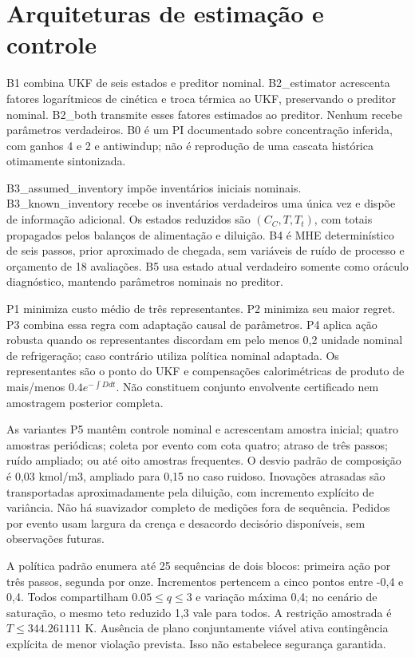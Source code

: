 \documentclass[
  11pt,
]{article}
\begin{document}
\hypertarget{arquiteturas-de-estimauxe7uxe3o-e-controle}{%
\section{Arquiteturas de estimação e
controle}\label{arquiteturas-de-estimauxe7uxe3o-e-controle}}

B1 combina UKF de seis estados e preditor nominal. B2\_estimator
acrescenta fatores logarítmicos de cinética e troca térmica ao UKF,
preservando o preditor nominal. B2\_both transmite esses fatores
estimados ao preditor. Nenhum recebe parâmetros verdadeiros. B0 é um PI
documentado sobre concentração inferida, com ganhos 4 e 2 e antiwindup;
não é reprodução de uma cascata histórica otimamente sintonizada.

B3\_assumed\_inventory impõe inventários iniciais nominais.
B3\_known\_inventory recebe os inventários verdadeiros uma única vez e
dispõe de informação adicional. Os estados reduzidos são
\((C_C,T,T_t)\), com totais propagados pelos balanços de alimentação e
diluição. B4 é MHE determinístico de seis passos, prior aproximado de
chegada, sem variáveis de ruído de processo e orçamento de 18
avaliações. B5 usa estado atual verdadeiro somente como oráculo
diagnóstico, mantendo parâmetros nominais no preditor.

P1 minimiza custo médio de três representantes. P2 minimiza seu maior
regret. P3 combina essa regra com adaptação causal de parâmetros. P4
aplica ação robusta quando os representantes discordam em pelo menos 0,2
unidade nominal de refrigeração; caso contrário utiliza política nominal
adaptada. Os representantes são o ponto do UKF e compensações
calorimétricas de produto de mais/menos \(0.4e^{-\int Ddt}\). Não
constituem conjunto envolvente certificado nem amostragem posterior
completa.

As variantes P5 mantêm controle nominal e acrescentam amostra inicial;
quatro amostras periódicas; coleta por evento com cota quatro; atraso de
três passos; ruído ampliado; ou até oito amostras frequentes. O desvio
padrão de composição é 0,03 kmol/m3, ampliado para 0,15 no caso ruidoso.
Inovações atrasadas são transportadas aproximadamente pela diluição, com
incremento explícito de variância. Não há suavizador completo de
medições fora de sequência. Pedidos por evento usam largura da crença e
desacordo decisório disponíveis, sem observações futuras.

A política padrão enumera até 25 sequências de dois blocos: primeira
ação por três passos, segunda por onze. Incrementos pertencem a cinco
pontos entre -0,4 e 0,4. Todos compartilham \(0.05\le q\le3\) e variação
máxima 0,4; no cenário de saturação, o mesmo teto reduzido 1,3 vale para
todos. A restrição amostrada é \(T\le344.261111\) K. Ausência de plano
conjuntamente viável ativa contingência explícita de menor violação
prevista. Isso não estabelece segurança garantida.
\end{document}
